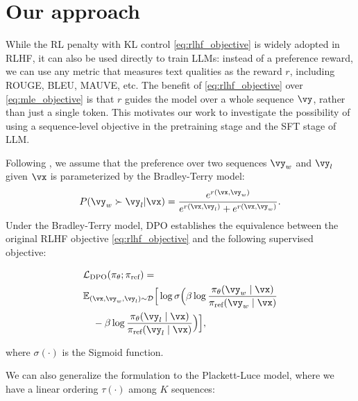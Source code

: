 \section{Our approach}
While the RL penalty with KL control \cref{eq:rlhf_objective} is widely adopted in RLHF, it can also be used directly to train LLMs: instead of a preference reward, we can use any metric that measures text qualities as the reward $r$, including ROUGE, BLEU, MAUVE, etc. The benefit of \cref{eq:rlhf_objective} over \cref{eq:mle_objective} is that $r$ guides the model over a whole sequence $\vy$, rather than just a single token. This motivates our work to investigate the possibility of using a sequence-level objective in the pretraining stage and the SFT stage of LLM.

Following \citet{rafailov2023direct}, we assume that the preference over two sequences $\vy_w$ and $\vy_l$ given $\vx$ is parameterized by the Bradley-Terry model:
\[
 P(\vy_w\succ\vy_l|\vx)=\frac{e^{r(\vx, \vy_w)}}{e^{r(\vx, \vy_l)}+e^{r(\vx, \vy_w)}}.
\]
Under the Bradley-Terry model, DPO establishes the equivalence between the original RLHF objective \cref{eq:rlhf_objective} and the following supervised objective:

\begin{align}
\begin{split}
	&\mathcal{L}_{\mathrm{DPO}}(\pi_\theta ; \pi_{\text{ref}})=\\
	&\mathbb{E}_{(\vx, \vy_w, \vy_l) \sim \mathcal{D}}\Big[ \log \sigma\Big(\beta \log \frac{\pi_\theta(\vy_w \mid \vx)}{\pi_{\text{ref}}(\vy_w \mid \vx)} \\
	&\quad -\beta \log \frac{\pi_\theta(\vy_l \mid \vx)}{\pi_{\text{ref}}(\vy_l \mid \vx)}\Big)\Big],
\end{split}
\end{align}

where $\sigma(\cdot)$ is the Sigmoid function.

We can also generalize the formulation to the Plackett-Luce model, where we have a linear ordering $\tau(\cdot)$ among $K$ sequences:

